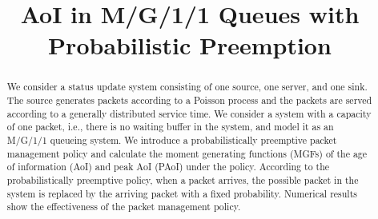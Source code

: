 \documentclass[conference]{IEEEtran}
\begin{document}
\title{AoI in M/G/1/1 Queues with Probabilistic Preemption
}
 \author{
 }

\maketitle
\begin{abstract}
We consider a status update system consisting of one source, one server, and one sink. The source generates packets according to a Poisson process and the packets are served according to a generally distributed service time. We consider a system with a capacity of one packet, i.e., there is no waiting buffer in the system, and model it as an M/G/1/1 queueing system. We introduce a probabilistically preemptive packet management policy and calculate the moment generating functions (MGFs) of the age of information (AoI) and peak AoI (PAoI) under the policy. According to the probabilistically preemptive policy, when a packet arrives, the possible packet in the system is replaced by the arriving packet with a fixed probability. Numerical results show the effectiveness of the packet management policy.

\end{abstract}	
\end{document}
